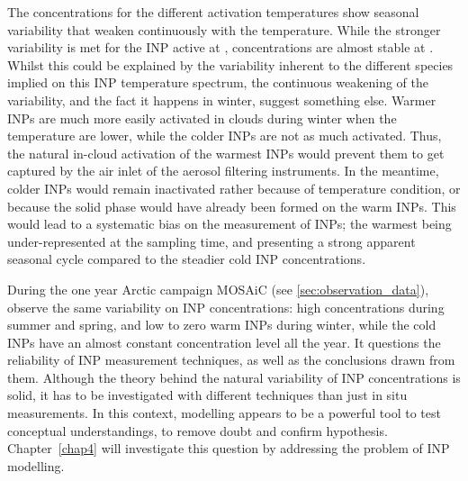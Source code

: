     The concentrations for the different activation temperatures show seasonal variability that weaken continuously with the temperature. While the stronger variability is met for the INP active at , concentrations are almost stable at . 
    Whilst this could be explained by the variability inherent to the different species implied on this INP temperature spectrum, the continuous weakening of the variability, and the fact it happens in winter, suggest something else. 
    Warmer INPs are much more easily activated in clouds during winter when the temperature are lower, while the colder INPs are not as much activated. Thus, the natural in-cloud activation of the warmest INPs would prevent them to get captured by the air inlet of the aerosol filtering instruments.
    In the meantime, colder INPs would remain inactivated rather because of temperature condition, or because the solid phase would have already been formed on the warm INPs.
    This would lead to a systematic bias on the measurement of INPs; the warmest being under-represented at the sampling time, and presenting a strong apparent seasonal cycle compared to the steadier cold INP concentrations.

    During the one year Arctic campaign MOSAiC (see \cref{sec:observation_data}), \citet{creamean_annual_2022} observe the same variability on INP concentrations: high concentrations during summer and spring, and low to zero warm INPs during winter, while the cold INPs have an almost constant concentration level all the year.
    It questions the reliability of INP measurement techniques, as well as the conclusions drawn from them. Although the theory behind the natural variability of INP concentrations is solid, it has to be investigated with different techniques than just in situ measurements.
    In this context, modelling appears to be a powerful tool to test conceptual understandings, to remove doubt and confirm hypothesis.
    Chapter~\ref{chap4} will investigate this question by addressing the problem of INP modelling.  
    \vspace{\baselineskip}



